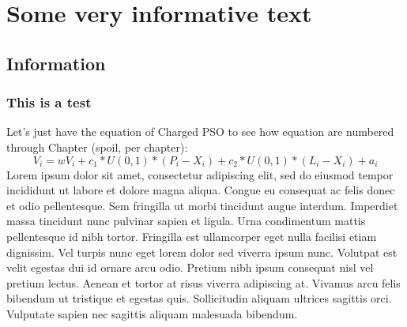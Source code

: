 \documentclass[../Thesis]{subfiles}
\begin{document}
\chapter{Some very informative text}
\section{Information}
\subsection{This is a test}

Let's just have the equation of Charged PSO to see how equation are numbered through Chapter (spoil, per chapter):
\begin{equation} 
    V_{i} = wV_{i} + c_{1} * U(0,1) * (P_{i} - X_{i}) + c_{2} * U(0,1) * (L_{i} - X_{i}) + a_{i} \label{eqn:velocityChargedUpdate} 
\end{equation} 
Lorem ipsum dolor sit amet, consectetur adipiscing elit, sed do eiusmod tempor incididunt ut labore et dolore magna aliqua. Congue eu consequat ac felis donec et odio pellentesque. Sem fringilla ut morbi tincidunt augue interdum. Imperdiet massa tincidunt nunc pulvinar sapien et ligula. Urna condimentum mattis pellentesque id nibh tortor. Fringilla est ullamcorper eget nulla facilisi etiam dignissim. Vel turpis nunc eget lorem dolor sed viverra ipsum nunc. Volutpat est velit egestas dui id ornare arcu odio. Pretium nibh ipsum consequat nisl vel pretium lectus. Aenean et tortor at risus viverra adipiscing at. Vivamus arcu felis bibendum ut tristique et egestas quis. Sollicitudin aliquam ultrices sagittis orci. Vulputate sapien nec sagittis aliquam malesuada bibendum.
\end{document}

